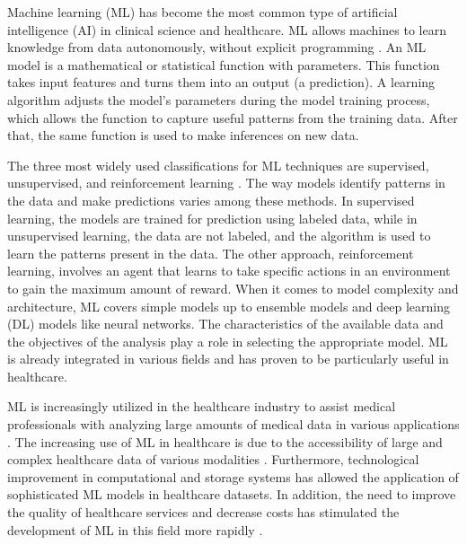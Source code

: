 Machine learning (\acrshort{ML}) has become the most common type of artificial intelligence (\acrshort{AI}) in clinical science and healthcare. ML allows machines to learn knowledge from data autonomously, without explicit programming \cite{Alpaydin2020Introduction}. An ML model is a mathematical or statistical function with parameters. This function takes input features and turns them into an output (a prediction). A learning algorithm adjusts the model's parameters during the model training process, which allows the function to capture useful patterns from the training data. After that, the same function is used to make inferences on new data.

The three most widely used classifications for ML techniques are supervised, unsupervised, and reinforcement learning \cite{Morales2022Brief}. The way models identify patterns in the data and make predictions varies among these methods. In supervised learning, the models are trained for prediction using labeled data, while in unsupervised learning, the data are not labeled, and the algorithm is used to learn the patterns present in the data. The other approach, reinforcement learning, involves an agent that learns to take specific actions in an environment to gain the maximum amount of reward. When it comes to model complexity and architecture, ML covers simple models up to ensemble models and deep learning (\acrshort{DL}) models like neural networks. The characteristics of the available data and the objectives of the analysis play a role in selecting the appropriate model. ML is already integrated in various fields and has proven to be particularly useful in healthcare.

ML is increasingly utilized in the healthcare industry to assist medical professionals with analyzing large amounts of medical data in various applications \cite{Habehh2021Machine}. The increasing use of ML in healthcare is due to the accessibility of large and complex healthcare data of various modalities \cite{Krones2025Review}. Furthermore, technological improvement in computational and storage systems has allowed the application of sophisticated ML models in healthcare datasets. In addition, the need to improve the quality of healthcare services and decrease costs has stimulated the development of ML in this field more rapidly \cite{Alowais2023Revolutionizing}.

